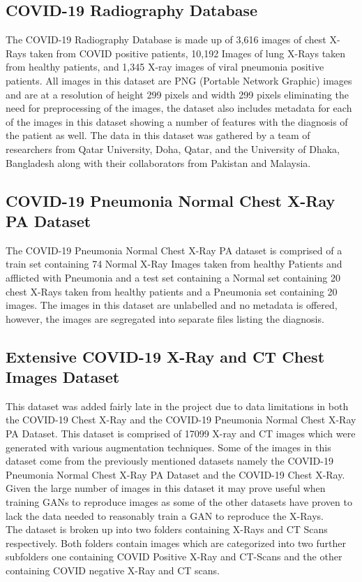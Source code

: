 \subsection{COVID-19 Radiography Database}
The COVID-19 Radiography Database is made up of 3,616 images of chest X-Rays taken from COVID positive patients, 10,192 Images of lung X-Rays taken from healthy patients, and 1,345 X-ray images of viral pneumonia positive patients. All images in this dataset are PNG (Portable Network Graphic) images and are at a resolution of height 299 pixels and width 299 pixels eliminating the need for preprocessing of the images, the dataset also includes metadata for each of the images in this dataset showing a number of features with the diagnosis of the patient as well. The data in this dataset was gathered by a team of researchers from Qatar University, Doha, Qatar, and the University of Dhaka, Bangladesh along with their collaborators from Pakistan and Malaysia.\cite{radiography}
\\
\subsection{COVID-19 Pneumonia Normal Chest X-Ray PA Dataset}
The COVID-19 Pneumonia Normal Chest X-Ray PA dataset is comprised of a train set containing 74 Normal X-Ray Images taken from healthy Patients and  afflicted with Pneumonia and a test set containing a Normal set containing 20 chest X-Rays taken from healthy patients and a Pneumonia set containing 20 images.  The images in this dataset are unlabelled and no metadata is offered, however, the images are segregated into separate files listing the diagnosis.\cite{covidDataset}
\\
\subsection{Extensive COVID-19 X-Ray and CT Chest Images Dataset}
This dataset was added fairly late in the project due to data limitations in both the COVID-19 Chest X-Ray and the COVID-19 Pneumonia Normal Chest X-Ray PA Dataset.  This dataset is comprised of 17099 X-ray and CT images which were generated with various augmentation techniques.  Some of the images in this dataset come from the previously mentioned datasets namely the COVID-19 Pneumonia Normal Chest X-Ray PA Dataset and the COVID-19 Chest X-Ray.  Given the large number of images in this dataset it may prove useful when training GANs to reproduce images as some of the other datasets have proven to lack the data needed to reasonably train a GAN to reproduce the X-Rays.
\\
The dataset is broken up into two folders containing X-Rays and CT Scans respectively. Both folders contain images which are categorized into two further subfolders 
one containing COVID Positive X-Ray and CT-Scans and the other containing COVID negative X-Ray and CT scans\cite{extendedCOVIDds}.
\\

